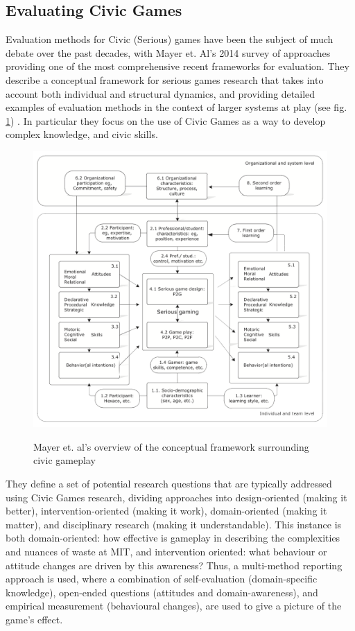 \documentclass[nofonts,nols,justified,nobib]{tufte-book}
\begin{document}
\subsection*{Evaluating Civic Games}

Evaluation methods for Civic (Serious) games have been the subject of much debate over the past decades, with Mayer et. Al's 2014 survey of approaches providing one of the most comprehensive recent frameworks for evaluation. They describe a conceptual framework for serious games research that takes into account both individual and structural dynamics, and providing detailed examples of evaluation methods in the context of larger systems at play (see fig. \ref{mayer}) \cite{mayer_research_2014}. In particular they focus on the use of Civic Games as a way to develop complex knowledge, and civic skills.

\begin{figure}
  \caption{Mayer et. al's overview of the conceptual framework surrounding civic gameplay \cite{mayer_research_2014}}
  \includegraphics[width=1\linewidth]{img/4/mayer-diagram.png}
  \label{mayer}
\end{figure}

They define a set of potential research questions that are typically addressed using Civic Games research, dividing approaches into design-oriented (making it better), intervention-oriented (making it work), domain-oriented (making it matter), and disciplinary research (making it understandable). This instance is both domain-oriented: how effective is gameplay in describing the complexities and nuances of waste at MIT, and intervention oriented: what behaviour or attitude changes are driven by this awareness? Thus, a multi-method reporting approach is used, where a combination of self-evaluation (domain-specific knowledge), open-ended questions (attitudes and domain-awareness), and empirical measurement (behavioural changes), are used to give a picture of the game's effect.
\end{document}
